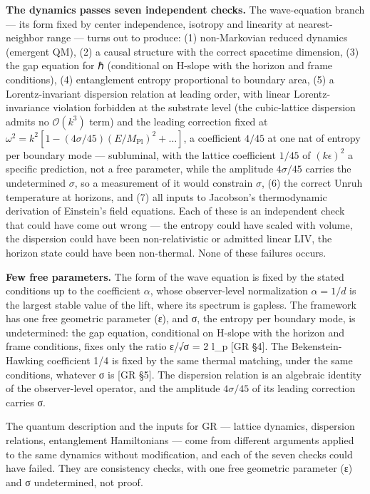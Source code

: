 \documentclass[
]{article}
\begin{document}
\textbf{The dynamics passes seven independent checks.} The wave-equation
branch --- its form fixed by center independence, isotropy and linearity
at nearest-neighbor range --- turns out to produce: (1) non-Markovian
reduced dynamics (emergent QM), (2) a causal structure with the correct
spacetime dimension, (3) the gap equation for ℏ (conditional on H-slope
with the horizon and frame conditions), (4) entanglement entropy
proportional to boundary area, (5) a Lorentz-invariant dispersion
relation at leading order, with linear Lorentz-invariance violation
forbidden at the substrate level (the cubic-lattice dispersion admits no
\(\mathcal{O}(k^3)\) term) and the leading correction fixed at
\(\omega^2 = k^2[1 - (4\sigma/45)(E/M_{\text{Pl}})^2 + \ldots]\), a
coefficient \(4/45\) at one nat of entropy per boundary mode ---
subluminal, with the lattice coefficient \(1/45\) of \((k\epsilon)^2\) a
specific prediction, not a free parameter, while the amplitude
\(4\sigma/45\) carries the undetermined \(\sigma\), so a measurement of
it would constrain \(\sigma\), (6) the correct Unruh temperature at
horizons, and (7) all inputs to Jacobson's thermodynamic derivation of
Einstein's field equations. Each of these is an independent check that
could have come out wrong --- the entropy could have scaled with volume,
the dispersion could have been non-relativistic or admitted linear LIV,
the horizon state could have been non-thermal. None of these failures
occurs.

\textbf{Few free parameters.} The form of the wave equation is fixed by
the stated conditions up to the coefficient \(\alpha\), whose
observer-level normalization \(\alpha=1/d\) is the largest stable value
of the lift, where its spectrum is gapless. The framework has one free
geometric parameter (ε), and σ, the entropy per boundary mode, is
undetermined: the gap equation, conditional on H-slope with the horizon
and frame conditions, fixes only the ratio ε/√σ = 2 l\_p {[}GR §4{]}.
The Bekenstein-Hawking coefficient 1/4 is fixed by the same thermal
matching, under the same conditions, whatever σ is {[}GR §5{]}. The
dispersion relation is an algebraic identity of the observer-level
operator, and the amplitude \(4\sigma/45\) of its leading correction
carries σ.

The quantum description and the inputs for GR --- lattice dynamics,
dispersion relations, entanglement Hamiltonians --- come from different
arguments applied to the same dynamics without modification, and each of
the seven checks could have failed. They are consistency checks, with
one free geometric parameter (ε) and σ undetermined, not proof.
\end{document}
